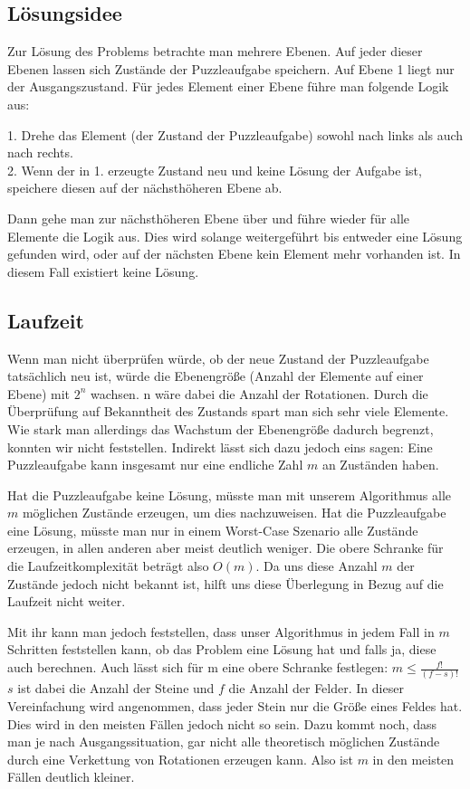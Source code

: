 \subsection {Lösungsidee}
	Zur Lösung des Problems betrachte man mehrere Ebenen. Auf jeder dieser Ebenen lassen sich Zustände der Puzzleaufgabe speichern. 
	Auf Ebene 1 liegt nur der Ausgangszustand. Für jedes Element einer Ebene führe man folgende Logik aus:

	1. Drehe das Element (der Zustand der Puzzleaufgabe) sowohl nach links als auch nach rechts.\\
	2. Wenn der in 1. erzeugte Zustand neu und keine Lösung der Aufgabe ist, speichere diesen auf der nächsthöheren Ebene ab.

	Dann gehe man zur nächsthöheren Ebene über und führe wieder für alle Elemente die Logik aus.
	Dies wird solange weitergeführt bis entweder eine Lösung gefunden wird, oder auf der nächsten Ebene kein Element mehr vorhanden ist.
	In diesem Fall existiert keine Lösung.

	
\subsection{Laufzeit}
	Wenn man nicht überprüfen würde, ob der neue Zustand der Puzzleaufgabe tatsächlich neu ist, würde die Ebenengröße (Anzahl der Elemente auf einer Ebene) mit \(2^n\) wachsen.  
	n wäre dabei die Anzahl der Rotationen. Durch die Überprüfung auf Bekanntheit des Zustands spart man sich sehr viele Elemente. 
	Wie stark man allerdings das Wachstum der Ebenengröße dadurch begrenzt, konnten wir nicht feststellen. Indirekt lässt sich dazu jedoch eins sagen: 
	Eine Puzzleaufgabe kann insgesamt nur eine endliche Zahl \(m\) an Zuständen haben. 

	Hat die Puzzleaufgabe keine Lösung, müsste man mit unserem Algorithmus alle \(m\) möglichen Zustände erzeugen, um dies nachzuweisen.
	Hat die Puzzleaufgabe eine Lösung, müsste man nur in einem Worst-Case Szenario alle  Zustände erzeugen, in allen anderen aber meist deutlich weniger.
	Die obere Schranke für die Laufzeitkomplexität beträgt also \(O(m)\). Da uns diese Anzahl \(m\) der Zustände jedoch nicht bekannt ist, 
	hilft uns diese Überlegung in Bezug auf die Laufzeit nicht weiter. 

	Mit ihr kann man jedoch feststellen, dass unser Algorithmus in jedem Fall in \(m\) Schritten feststellen kann, ob das Problem eine Lösung hat und falls ja, diese auch berechnen. 
	Auch lässt sich für m eine obere Schranke festlegen: \(m \le \frac{f!}{(f-s)!}\) \(s\) ist dabei die Anzahl der Steine und \(f\) die Anzahl der Felder. 
	In dieser Vereinfachung wird angenommen, dass jeder Stein nur die Größe eines Feldes hat. Dies wird in den meisten Fällen jedoch nicht so sein.
	Dazu kommt noch, dass man je nach Ausgangssituation, 
	gar nicht alle theoretisch möglichen Zustände durch eine Verkettung von Rotationen erzeugen kann. 
	Also ist \(m\) in den meisten Fällen deutlich kleiner. 

